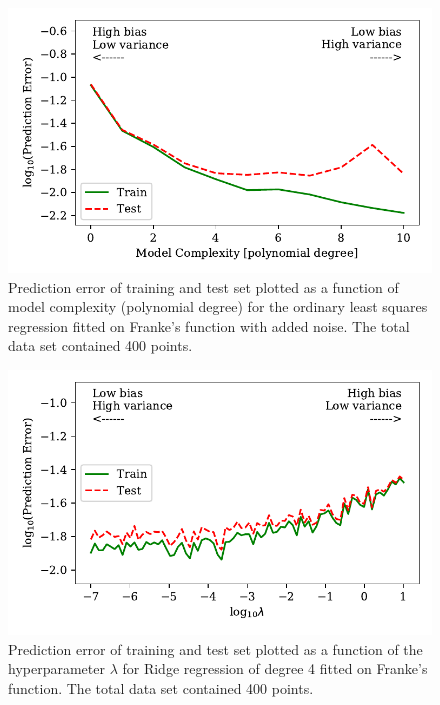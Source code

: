 \documentclass[a4paper, 10pt]{article}
\begin{document}
\begin{figure}
    \includegraphics[scale=1]{figs/biasvariancetradeoff_ols_Franke.pdf}
    \caption{Prediction error of training and test set plotted as a function of model complexity (polynomial degree) for the ordinary least squares regression fitted on Franke's function with added noise. The total data set contained 400 points.}
    \label{fig:bias_ols_Franke}
\end{figure}

\begin{figure}
    \includegraphics{figs/biasvariancetradeoff_Ridge_Franke.pdf}
    \caption{Prediction error of training and test set plotted as a function of the hyperparameter $\lambda$ for Ridge regression of degree 4 fitted on Franke's function. The total data set contained 400 points.}
    \label{fig:bias_ridge_Franke}
\end{figure}
\end{document}
